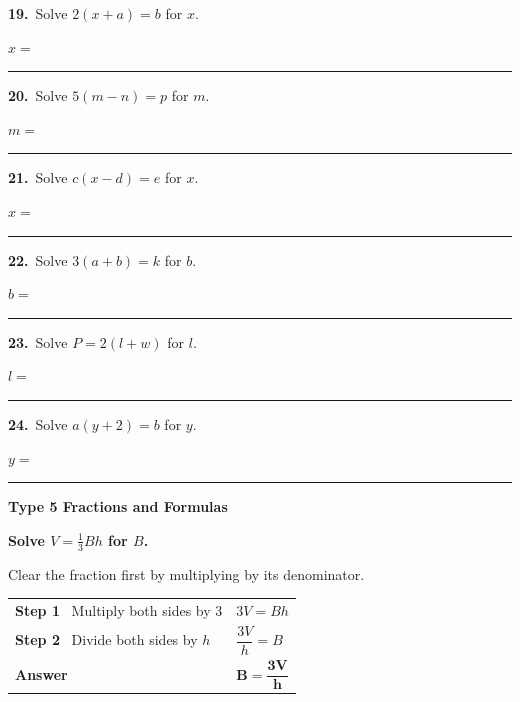 \documentclass[11pt,letterpaper]{article}
\newcommand{\topicbar}[1]{\needspace{4.5cm}\par\vspace{5mm}
  \begin{tcolorbox}[enhanced,colback=fmtitle,colframe=fmtitle,arc=2mm,left=4mm,top=1.5mm,bottom=1.5mm]
  \color{white}\bfseries\large #1
  \end{tcolorbox}}
\begin{document}
\needspace{3.5cm}\par\vspace{3mm}\noindent \begin{minipage}[t][3.0cm]{0.48\linewidth}\raggedright{\color{fmturn}\bfseries 19.}\ Solve $2(x + a) = b$ for $x$.\par\vfill\hfill $x = $\ \rule{3.2cm}{0.4pt}\end{minipage}\hfill \begin{minipage}[t][3.0cm]{0.48\linewidth}\raggedright{\color{fmturn}\bfseries 20.}\ Solve $5(m - n) = p$ for $m$.\par\vfill\hfill $m = $\ \rule{3.2cm}{0.4pt}\end{minipage}\par
\needspace{3.5cm}\par\vspace{3mm}\noindent \begin{minipage}[t][3.0cm]{0.48\linewidth}\raggedright{\color{fmturn}\bfseries 21.}\ Solve $c(x - d) = e$ for $x$.\par\vfill\hfill $x = $\ \rule{3.2cm}{0.4pt}\end{minipage}\hfill \begin{minipage}[t][3.0cm]{0.48\linewidth}\raggedright{\color{fmturn}\bfseries 22.}\ Solve $3(a + b) = k$ for $b$.\par\vfill\hfill $b = $\ \rule{3.2cm}{0.4pt}\end{minipage}\par
\needspace{3.5cm}\par\vspace{3mm}\noindent \begin{minipage}[t][3.0cm]{0.48\linewidth}\raggedright{\color{fmturn}\bfseries 23.}\ Solve $P = 2(l + w)$ for $l$.\par\vfill\hfill $l = $\ \rule{3.2cm}{0.4pt}\end{minipage}\hfill \begin{minipage}[t][3.0cm]{0.48\linewidth}\raggedright{\color{fmturn}\bfseries 24.}\ Solve $a(y + 2) = b$ for $y$.\par\vfill\hfill $y = $\ \rule{3.2cm}{0.4pt}\end{minipage}\par
\needspace{9cm}\topicbar{Type 5 \quad Fractions and Formulas}
\begin{watchme}\textbf{Solve $V = \tfrac13 Bh$ for $B$.}\par\vspace{1mm}
Clear the fraction first by multiplying by its denominator.\par\vspace{1mm}
\renewcommand{\arraystretch}{2.1}\begin{tabular}{@{}l l@{}}
\textbf{Step 1} \ Multiply both sides by 3 & $3V = Bh$\\
\textbf{Step 2} \ Divide both sides by $h$ & $\dfrac{3V}{h} = B$\\
\textbf{Answer} & $\boldsymbol{B = \dfrac{3V}{h}}$
\end{tabular}\end{watchme}
\end{document}
